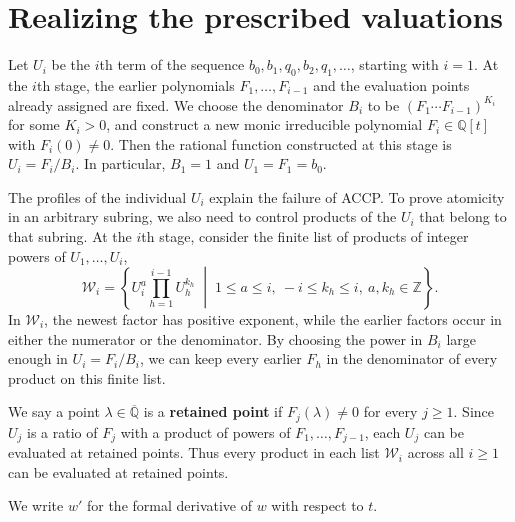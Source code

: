 \documentclass{article}
\theoremstyle{remark}
\begin{document}
\section{Realizing the prescribed valuations}
\label{sec:realization}

Let $U_i$ be the $i$th term of the sequence $b_0, b_1, q_0, b_2, q_1, \ldots$, starting with $i = 1$.
At the $i$th stage, the earlier polynomials $F_1, \ldots, F_{i - 1}$ and the evaluation points already assigned are fixed.
We choose the denominator $B_i$ to be $(F_1 \cdots F_{i - 1})^{K_i}$ for some $K_i > 0$, and construct a new monic irreducible polynomial $F_i \in \mathbb{Q}[t]$ with $F_i(0) \ne 0$.
Then the rational function constructed at this stage is $U_i = F_i/B_i$.
In particular, $B_1 = 1$ and $U_1 = F_1 = b_0$.

The profiles of the individual $U_i$ explain the failure of ACCP.
To prove atomicity in an arbitrary subring, we also need to control products of the $U_i$ that belong to that subring.
At the $i$th stage, consider the finite list of products of integer powers of $U_1, \ldots, U_i$,
\[
    \mathcal{W}_i =
    \left\{
        U_i^a \prod_{h = 1}^{i - 1} U_h^{k_h}
        \;\middle|\;
        1 \le a \le i,\ -i \le k_h \le i,\ a, k_h \in \mathbb{Z}
    \right\}.
\]
In $\mathcal{W}_i$, the newest factor has positive exponent, while the earlier factors occur in either the numerator or the denominator.
By choosing the power in $B_i$ large enough in $U_i = F_i / B_i$, we can keep every earlier $F_h$ in the denominator of every product on this finite list.

We say a point $\lambda \in \overline{\mathbb{Q}}$ is a \textbf{retained point} if $F_j(\lambda) \ne 0$ for every $j \ge 1$.
Since $U_j$ is a ratio of $F_j$ with a product of powers of $F_1, \ldots, F_{j-1}$, each $U_j$ can be evaluated at retained points.
Thus every product in each list $\mathcal{W}_i$ across all $i \ge 1$ can be evaluated at retained points.

We write $w'$ for the formal derivative of $w$ with respect to $t$.
\end{document}
